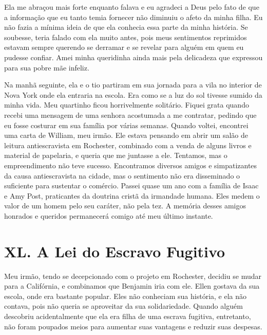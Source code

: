 Ela me abraçou mais forte enquanto falava e eu agradeci a Deus pelo fato
de que a informação que eu tanto temia fornecer não diminuiu o afeto da
minha filha. Eu não fazia a mínima ideia de que ela conhecia essa parte
da minha história. Se soubesse, teria falado com ela muito antes, pois
meus sentimentos reprimidos estavam sempre querendo se derramar e se
revelar para alguém em quem eu pudesse confiar. Amei minha queridinha
ainda mais pela delicadeza que expressou para sua pobre mãe infeliz.

Na manhã seguinte, ela e o tio partiram
em sua jornada para a vila no interior de Nova York onde ela entraria na
escola. Era como se a luz do sol tivesse sumido da minha vida. Meu
quartinho ficou horrivelmente solitário. Fiquei grata quando recebi uma
mensagem de uma senhora acostumada a me contratar, pedindo que eu fosse
costurar em sua família por várias semanas. Quando voltei, encontrei uma
carta de William, meu irmão. Ele estava pensando em abrir um salão de
leitura antiescravista em Rochester, combinado com a venda de alguns
livros e material de papelaria, e queria que me juntasse a ele.
Tentamos, mas o empreendimento não teve sucesso. Encontramos diversos
amigos e simpatizantes da causa antiescravista na cidade, mas o
sentimento não era disseminado o suficiente para sustentar o comércio.
Passei quase um ano com a família de Isaac e Amy Post, praticantes da
doutrina cristã da irmandade humana. Eles medem o valor de um homem pelo
seu caráter, não pela tez. A memória desses amigos honrados e queridos
permanecerá comigo até meu último instante.

\chapter{XL. A Lei do Escravo
Fugitivo}

Meu irmão, tendo se decepcionado com o
projeto em Rochester, decidiu se mudar para a Califórnia, e combinamos
que Benjamin iria com ele. Ellen gostava da sua escola, onde era
bastante popular. Eles não conheciam sua história, e ela não contava,
pois não queria se aproveitar da sua solidariedade. Quando alguém
descobriu acidentalmente que ela era filha de uma escrava fugitiva,
entretanto, não foram poupados meios para aumentar suas vantagens e
reduzir suas despesas.

